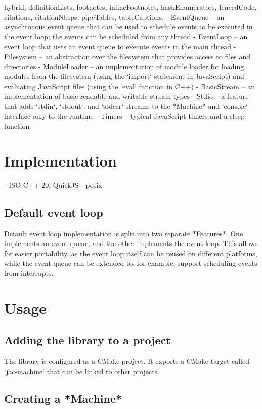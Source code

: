 \documentclass[
  digital,
  oneside,
  nosansbold,
  nocolorbold,
  lof,
  lot
]{fithesis4}
\begin{document}
\begin{markdown*}{%
  hybrid,
  definitionLists,
  footnotes,
  inlineFootnotes,
  hashEnumerators,
  fencedCode,
  citations,
  citationNbsps,
  pipeTables,
  tableCaptions,
}
  - EventQueue -- an asynchronous event queue that can be used to schedule events to be executed in the event loop; the events can be scheduled from any thread
  - EventLoop -- an event loop that uses an event queue to execute events in the main thread
  - Filesystem -- an abstraction over the filesystem that provides access to files and directories
  - ModuleLoader -- an implementation of module loader for loading modules from the filesystem (using the `import` statement in JavaScript) and evaluating JavaScript files (using the `eval` function in C++)
  - BasicStream -- an implementation of basic readable and writable stream types
  - Stdio -- a feature that adds `stdin`, `stdout`, and `stderr` streams to the *Machine* and `console` interface only to the runtime
  - Timers -- typical JavaScript timers and a sleep function


\section{Implementation}

- ISO C++ 20, QuickJS - posix

\subsection{Default event loop}

Default event loop implementation is split into two separate *Features*. One implements an event queue, and the other implements the event loop. This allows for easier portability, as the event loop itself can be reused on different platforms, while the event queue can be extended to, for example, support scheduling events from interrupts.

\section{Usage}

\subsection{Adding the library to a project}

The library is configured as a CMake project. It exports a CMake target called `jac-machine` that can be linked to other projects.

\subsection{Creating a *Machine*}


\end{markdown*}
\end{document}

